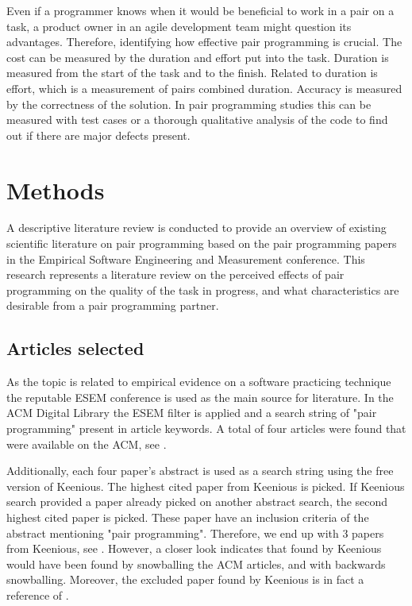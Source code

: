 \documentclass[conference]{IEEEtran}
\begin{document}
Even if a programmer knows when it would be beneficial to work in a pair on a task, a product owner in an agile development team might question its advantages. Therefore, identifying how effective pair programming is crucial. The cost can be measured by the duration and effort put into the task. Duration is measured from the start of the task and to the finish. Related to duration is effort, which is a measurement of pairs combined duration. Accuracy is measured by the correctness of the solution. In pair programming studies this can be measured with test cases or a thorough qualitative analysis of the code to find out if there are major defects present.

\section{Methods}

A descriptive literature review is conducted to provide an overview of existing scientific literature on pair programming based on the pair programming papers in the Empirical Software Engineering and Measurement conference. This research represents a literature review on the perceived effects of pair programming on the quality of the task in progress, and what characteristics are desirable from a pair programming partner. 

\subsection{Articles selected}

As the topic is related to empirical evidence on a software practicing technique the reputable ESEM conference is used as the main source for literature. In the ACM Digital Library the ESEM filter is applied and a search string of "pair programming" present in article keywords. A total of four articles were found that were available on the ACM, see \cite{10.1145/2652524.2652529, 10.1145/1414004.1414026, 10.1145/1852786.1852816, 10.1145/1159733.1159749}.

Additionally, each four paper's abstract is used as a search string using the free version of Keenious. The highest cited paper from Keenious is picked. If Keenious search provided a paper already picked on another abstract search, the second highest cited paper is picked. These paper have an inclusion criteria of the abstract mentioning "pair programming". Therefore, we end up with 3 papers from Keenious, see \cite{Williams2000Strengthening, Arisholm2007Evaluating, Hannay2009effectiveness}. However, a closer look indicates that \cite{Williams2000Strengthening, Arisholm2007Evaluating} found by Keenious would have been found by snowballing the ACM articles, and \cite{Hannay2009effectiveness} with backwards snowballing. Moreover, the excluded paper \cite{ChamorroPremuzic2003Personality} found by Keenious is in fact a reference of \cite{10.1145/1852786.1852816}.
\end{document}
